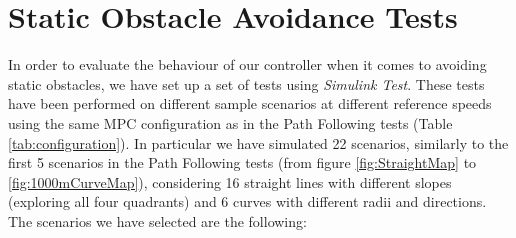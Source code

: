 \section{Static Obstacle Avoidance Tests} 
\label{chap:static_obstacle_avoidance_tests}
In order to evaluate the behaviour of our controller when it comes to avoiding static obstacles, we have set up a set of tests using \textit{Simulink Test}. These tests have been performed on different sample scenarios at different reference speeds using the same MPC configuration as in the Path Following tests (Table \ref{tab:configuration}). In particular we have simulated 22 scenarios, similarly to the first 5 scenarios in the Path Following tests (from figure \ref{fig:StraightMap} to \ref{fig:1000mCurveMap}), considering 16 straight lines with different slopes (exploring all four quadrants) and 6 curves with different radii and directions.
The scenarios we have selected are the following:
